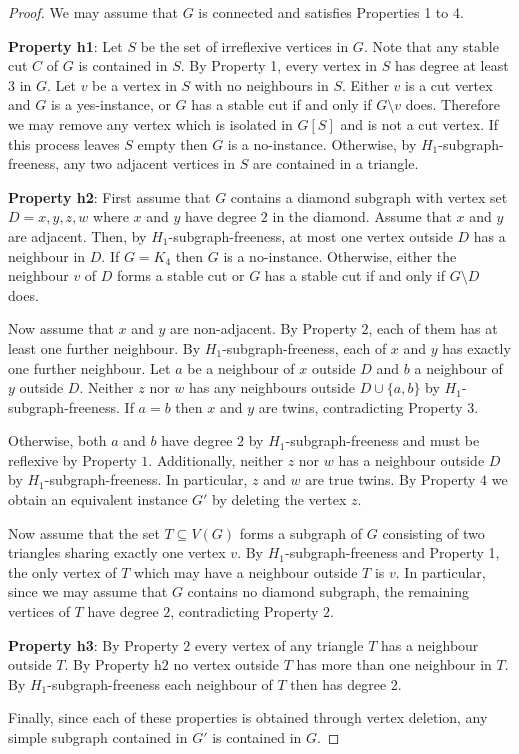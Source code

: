 \documentclass[a4paper,UKenglish,cleveref, autoref,thm-restate]{lipics-v2021}
\begin{document}
\begin{proof}
We may assume that $G$ is connected and satisfies Properties 1 to 4.

\textbf{Property h1}:
Let $S$ be the set of irreflexive vertices in $G$. Note that any stable cut $C$ of $G$ is contained in $S$. By Property 1, every vertex in $S$ has degree at least $3$ in $G$. Let $v$ be a vertex in $S$ with no neighbours in $S$. Either $v$ is a cut vertex and $G$ is a yes-instance, or $G$ has a stable cut if and only if $G \setminus v$ does. Therefore we may remove any vertex which is isolated in $G[S]$ and is not a cut vertex. If this process leaves $S$ empty then $G$ is a no-instance. Otherwise, by $H_1$-subgraph-freeness, any two adjacent vertices in $S$ are contained in a triangle.

\textbf{Property h2}:
First assume that $G$ contains a diamond subgraph with vertex set $D={x,y,z,w}$ where $x$ and $y$ have degree $2$ in the diamond. Assume that $x$ and $y$ are adjacent. Then, by $H_1$-subgraph-freeness, at most one vertex outside $D$ has a neighbour in $D$. If $G=K_4$ then $G$ is a no-instance. Otherwise, either the neighbour $v$ of $D$ forms a stable cut or $G$ has a stable cut if and only if $G \setminus D$ does.

Now assume that $x$ and $y$ are non-adjacent. By Property $2$, each of them has at least one further neighbour. By $H_1$-subgraph-freeness, each of $x$ and $y$ has exactly one further neighbour. Let $a$ be a neighbour of $x$ outside $D$ and $b$ a neighbour of $y$ outside $D$. Neither $z$ nor $w$ has any neighbours outside $D \cup \{a, b \}$ by $H_1$-subgraph-freeness. If $a=b$ then $x$ and $y$ are twins, contradicting Property $3$.

Otherwise, both $a$ and $b$ have degree $2$ by $H_1$-subgraph-freeness and must be reflexive by Property $1$. Additionally, neither $z$ nor $w$ has a neighbour outside $D$ by $H_1$-subgraph-freeness. In particular, $z$ and $w$ are true twins. By Property $4$ we obtain an equivalent instance $G'$ by deleting the vertex $z$.

Now assume that the set $T \subseteq V(G)$  forms a subgraph of $G$ consisting of two triangles sharing exactly one vertex $v$. By $H_1$-subgraph-freeness and Property 1, the only vertex of $T$ which may have a neighbour outside $T$ is $v$. In particular, since we may assume that $G$ contains no diamond subgraph, the remaining vertices of $T$ have degree $2$, contradicting Property $2$.

\textbf{Property h3}:
By Property $2$ every vertex of any triangle $T$ has a neighbour outside $T$. By Property h$2$ no vertex outside $T$ has more than one neighbour in $T$. By $H_1$-subgraph-freeness each neighbour of $T$ then has degree $2$.

Finally, since each of these properties is obtained through vertex deletion, any simple subgraph contained in $G'$ is contained in $G$.%
\end{proof}
\end{document}
